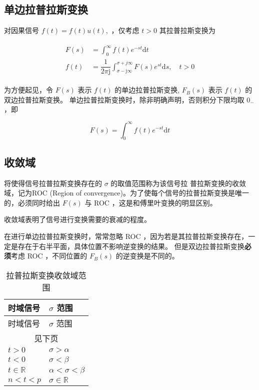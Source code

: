 \documentclass[cn,11pt,chinese,black,simple]{../elegantbook}
\begin{document}
\subsection{单边拉普拉斯变换}

对因果信号 $f(t)=f(t) u(t),$ ，仅考虑 \(t > 0\) 其拉普拉斯变换为

\[
\begin{array}{l}
\begin{aligned}
    
F(s)&=\int_{0}^{\infty} f(t) e^{-s t} \mathrm{d} t \\
f(t)&=\dfrac{1}{2 \pi \mathrm{j}} \int_{\sigma-\mathrm{j} \infty}^{\sigma+j \infty} F(s) e^{s t} \mathrm{d} s, \quad t>0
\end{aligned}
\end{array}
\]

为方便起见，令 $F(s)$ 表示 $f(t)$ 的单边拉普拉斯变换, $F_{B}(s)$ 表示 $f(t)$ 的双边拉普拉斯变换。
单边拉普拉斯变换时，除非明确声明，否则积分下限均取 \(0_-\) ，即

\[
F(s)=\int_{0}^{\infty} f(t) e^{-s t} \mathrm{d} t
\]

\subsection{收敛域}

将使得信号拉普拉斯变换存在的 \(\sigma\) 的取值范围称为该信号拉
普拉斯变换的收敛域，记为ROC (Region of convergence)。为了使每个信号的拉普拉斯变换是唯一的，必须同时给出 \(F(s)\) 与 ROC ，这是和傅里叶变换的明显区别。

收敛域表明了信号进行变换需要的衰减的程度。

在进行单边拉普拉斯变换时，常常忽略 ROC ，因为若是其拉普拉斯变换存在，一定是存在于右半平面，具体位置不影响逆变换的结果。
但是双边拉普拉斯变换\textbf{必须}考虑 ROC ，不同位置的 \(F_B(s)\) 的逆变换是不同的。

\begin{longtable}{ll} 
    \caption{拉普拉斯变换收敛域范围} \\ 
    \toprule
    时域信号 & \(\sigma\) 范围 \\ 
    \midrule
    \endfirsthead
    
    \toprule
    时域信号 & \(\sigma\) 范围 \\ 
    \midrule
    \endhead 
  
    \hline
    \multicolumn{2}{c}{见下页}\\   \bottomrule
    \endfoot
  
    \bottomrule
    \endlastfoot
    \(t > 0\) & \(\sigma > \alpha\) \\
    \(t < 0\) & \(\sigma < \beta\) \\
    \(t \in \mathbb{R}\) & \(\alpha < \sigma < \beta\) \\
    \(n < t < p\) & \(\sigma \in \mathbb{R}\)
  
\end{longtable}
\end{document}
